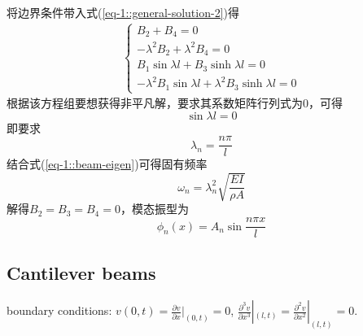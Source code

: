将边界条件带入式(\ref{eq-1::general-solution-2})得
\begin{equation}
    \begin{aligned}
        \left\{\begin{array}{l}
            B_{2} + B_{4} = 0\\
            -\lambda^{2}B_{2} + \lambda^{2}B_{4} = 0\\
            B_{1}\sin \lambda l + B_{3}\sinh \lambda l = 0\\
            -\lambda^{2}B_{1}\sin \lambda l + \lambda^{2}B_{3}\sinh \lambda l = 0
        \end{array}\right.
    \end{aligned}
\end{equation}
根据该方程组要想获得非平凡解，要求其系数矩阵行列式为0，可得
\begin{equation}
    \sin \lambda l =0
\end{equation}
即要求
\begin{equation}
    \lambda_{n} = \frac{n\pi}{l}
\end{equation}
结合式(\ref{eq-1::beam-eigen})可得固有频率
\begin{equation}
    \omega_{n}=\lambda_{n}^{2}\sqrt{\frac{EI}{\rho A}}
\end{equation}
解得$B_{2}=B_{3}=B_{4}=0$，模态振型为
\begin{equation}
    \phi_{n}(x)=A_{n}\sin\frac{n\pi x}{l}
\end{equation}

\subsection{Cantilever beams}

boundary conditions: $v(0,t)=\frac{\partial v}{\partial x}|_{(0,t)}=0$, 
$\frac{\partial^{3} v}{\partial x^{3}}|_{(l,t)}=\frac{\partial^{2} v}{\partial x^{2}}|_{(l,t)}=0$. 

